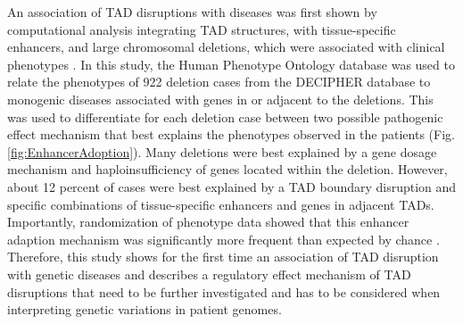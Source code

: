 \documentclass[a4paper,twoside=true,openright,parskip=full,chapterprefix=true,11pt,headings=normal,bibliography=totoc,listof=totoc,titlepage=on,captions=tableabove,draft=false]{scrreprt}
\theoremstyle{definition}
\theoremstyle{definition}
\theoremstyle{definition}
\theoremstyle{remark}
\begin{document}
An association of TAD disruptions with diseases was first shown by
computational analysis integrating TAD structures, with tissue-specific
enhancers, and large chromosomal deletions, which were associated with
clinical phenotypes \citep{Ibn-Salem2014}. In this study, the Human
Phenotype Ontology database \citep{Kohler2014} was used to relate the
phenotypes of 922 deletion cases from the DECIPHER database
\citep{Firth2009} to monogenic diseases associated with genes in or
adjacent to the deletions. This was used to differentiate for each
deletion case between two possible pathogenic effect mechanism that best
explains the phenotypes observed in the patients (Fig.
\ref{fig:EnhancerAdoption}). Many deletions were best explained by a
gene dosage mechanism and haploinsufficiency of genes located within the
deletion. However, about 12 percent of cases were best explained by a
TAD boundary disruption and specific combinations of tissue-specific
enhancers and genes in adjacent TADs. Importantly, randomization of
phenotype data showed that this enhancer adaption mechanism was
significantly more frequent than expected by chance
\citep{Ibn-Salem2014}. Therefore, this study shows for the first time an
association of TAD disruption with genetic diseases and describes a
regulatory effect mechanism of TAD disruptions that need to be further
investigated and has to be considered when interpreting genetic
variations in patient genomes.
\end{document}
